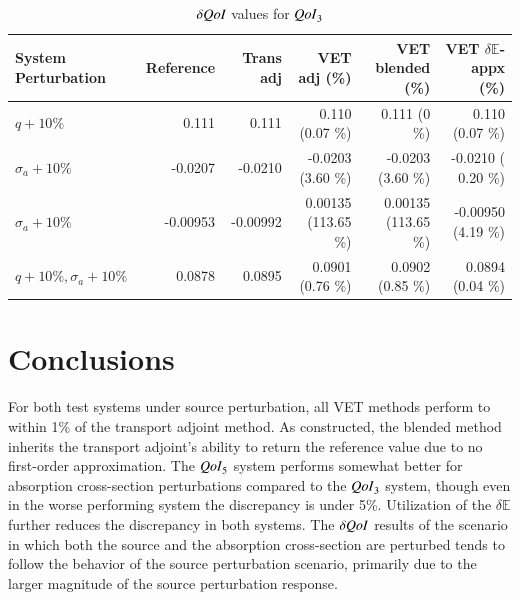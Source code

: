 \documentclass{anstrans}
\newcommand{\Edd}{\mathbb{E}}
\newcommand{\siga}{\sigma_a}
\newcommand{\qoi}{{\it QoI}\xspace}
\begin{document}
\begin{table}
  \centering
  \caption{$\delta \qoi$ values for $\qoi_3$}
  \begin{tabular}{l|rr|rrr}\toprule
  System Perturbation    & Reference     & Trans adj     & VET adj \hspace{1mm} (\%)    &   VET blended \hspace{1mm} (\%)   & VET $\delta \Edd$-appx  \hspace{1mm} (\%) 
\\ \midrule
$q+10\%$  & 0.111   & 0.111   & 0.110 \hspace{1mm} (0.07 \%) & 0.111   \hspace{1mm} (0 \%) & 0.110 \hspace{1mm} (0.07 \%) 
\\
$\siga+10\%$  &-0.0207  & -0.0210 & -0.0203  \hspace{1mm} (3.60 \%)  & -0.0203 \hspace{1mm} (3.60 \%)  & -0.0210 \hspace{1mm} ( 0.20 \%) 
\\
$\siga+10\%$  & -0.00953   & -0.00992   & 0.00135   \hspace{1mm} (113.65 \%)  & 0.00135  \hspace{1mm} (113.65 \%)  & -0.00950 \hspace{1mm} (4.19 \%) 
\\
$q+10\%,\siga+10\%$  & 0.0878  & 0.0895  & 0.0901 \hspace{1mm} (0.76 \%)  & 0.0902 \hspace{1mm} (0.85 \%)   &  0.0894   \hspace{1mm} (0.04 \%) 
\\
\bottomrule
\end{tabular}
  \label{tab:qoi2}
\end{table}



\section{Conclusions}
For both test systems under source perturbation, all VET methods perform to within 1\% of the transport adjoint method. As constructed, the blended method inherits the transport adjoint's ability to return the reference value due to no first-order approximation. The $\qoi_5$ system performs somewhat better for absorption cross-section perturbations compared to the $\qoi_3$ system, though even in the worse performing system the discrepancy is under 5\%. Utilization of the $\delta \Edd$ further reduces the discrepancy in both systems. The $\delta \qoi$ results of the scenario in which both the source and the absorption cross-section are perturbed tends to follow the behavior of the source perturbation scenario, primarily due to the larger magnitude of the source perturbation response. 
\end{document}
